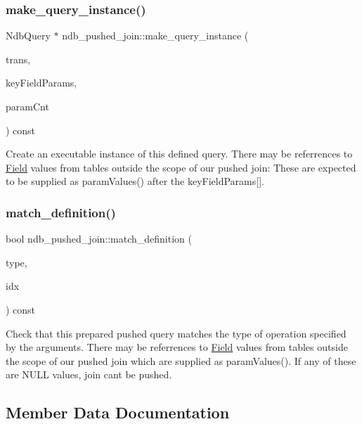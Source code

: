 \subsubsection{\texorpdfstring{make\+\_\+query\+\_\+instance()}{make\_query\_instance()}}
{\footnotesize\ttfamily Ndb\+Query $\ast$ ndb\+\_\+pushed\+\_\+join\+::make\+\_\+query\+\_\+instance (\begin{DoxyParamCaption}\item[{Ndb\+Transaction $\ast$}]{trans,  }\item[{const Ndb\+Query\+Param\+Value $\ast$}]{key\+Field\+Params,  }\item[{uint}]{param\+Cnt }\end{DoxyParamCaption}) const}

Create an executable instance of this defined query. There may be referrences to \mbox{\hyperlink{classField}{Field}} values from tables outside the scope of our pushed join\+: These are expected to be supplied as param\+Values() after the key\+Field\+Params\mbox{[}\mbox{]}.\mbox{\label{classndb__pushed__join_a3f7d75c3ba2a72c63b32f030a7a57ad5}} 
\subsubsection{\texorpdfstring{match\+\_\+definition()}{match\_definition()}}
{\footnotesize\ttfamily bool ndb\+\_\+pushed\+\_\+join\+::match\+\_\+definition (\begin{DoxyParamCaption}\item[{int}]{type,  }\item[{const \mbox{\hyperlink{structndb__index__data}{N\+D\+B\+\_\+\+I\+N\+D\+E\+X\+\_\+\+D\+A\+TA}} $\ast$}]{idx }\end{DoxyParamCaption}) const}

Check that this prepared pushed query matches the type of operation specified by the arguments. There may be referrences to \mbox{\hyperlink{classField}{Field}} values from tables outside the scope of our pushed join which are supplied as param\+Values(). If any of these are N\+U\+LL values, join can\textquotesingle{}t be pushed.

\subsection{Member Data Documentation}
\mbox{\label{classndb__pushed__join_a818793739d73a5a0fe90088b222089f9}} 
